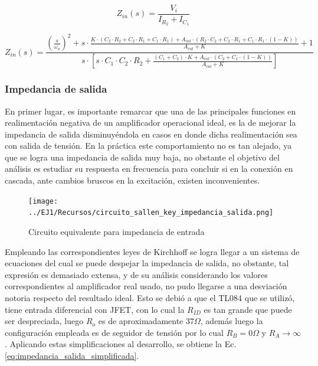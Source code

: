 \begin{equation}
    Z_{in}(s) = \frac{V_i}{I_{R_2} + I_{C_1}}
\end{equation}

\begin{equation}
    Z_{in}(s) = 
    \frac{\left( \frac{s}{\omega_o} \right)^{2} + s \cdot \frac{K \cdot (C_2 \cdot R_2 + C_2 \cdot R_1 + C_1 \cdot R_1) + A_{vol} \cdot (R_2 \cdot C_2 + C_2 \cdot R_1 + C_1 \cdot R_1 \cdot (1 - K))}{A_{vol} + K} + 1}
    {s \cdot \left[ s \cdot C_1 \cdot C_2 \cdot R_2 + \frac{(C_1 + C_2) \cdot K + A_{vol} \cdot (C_2 + C_1 \cdot(1 - K))}{A_{vol} + K} \right]}
\end{equation}

\subsubsection{Impedancia de salida}
En primer lugar, es importante remarcar que una de las principales funciones en realimentaci\'on negativa de un amplificador operacional ideal,
es la de mejorar la impedancia de salida disminuy\'endola en casos en donde dicha realimentaci\'on sea con salida de tensi\'on. En la pr\'actica este comportamiento
no es tan alejado, ya que se logra una impedancia de salida muy baja, no obstante el objetivo del an\'alisis es estudiar su respuesta en frecuencia para concluir
si en la conexi\'on en cascada, ante cambios bruscos en la excitaci\'on, existen inconvenientes.

\begin{figure}[H]
    \centering
    \texttt{[image: ../EJ1/Recursos/circuito\_sallen\_key\_impedancia\_salida.png]}
    \caption{Circuito equivalente para impedancia de entrada}
    \label{fig:sallen_key_impedancia_salidas}
\end{figure}

Empleando las correspondientes leyes de Kirchhoff se logra llegar a un sistema de ecuaciones del cual se puede despejar la impedancia de salida, no obstante,
tal expresi\'on es demasiado extensa, y de su an\'alisis considerando los valores correspondientes al amplificador real usado, no pudo llegarse a una desviaci\'on
notoria respecto del resultado ideal. Esto se debi\'o a que el TL084 que se utiliz\'o, tiene entrada diferencial con JFET, con lo cual la $R_{ID}$ es tan grande que puede 
ser despreciada, luego $R_o$ es de aproximadamente $37 \Omega$, adem\'as luego la configuraci\'on empleada es de seguidor de tensi\'on por lo cual $R_B = 0\Omega$ y $R_A \rightarrow \infty$.
Aplicando estas simplificaciones al desarrollo, se obtiene la Ec. \ref{eq:impedancia_salida_simplificada}.

